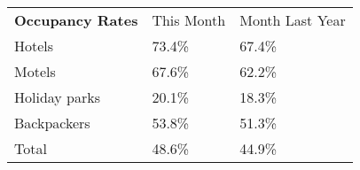 \begin{tabular}[t]{p{4.5cm}>{\hfill}p{1.3cm}>{\hfill}p{1.7cm}}
 \textbf{Occupancy Rates} & This Month & Month Last Year \\ 
 Hotels & 73.4\% & 67.4\% \\ 
  Motels & 67.6\% & 62.2\% \\ 
  Holiday parks & 20.1\% & 18.3\% \\ 
  Backpackers & 53.8\% & 51.3\% \\ 
  Total & 48.6\% & 44.9\% \\ 
  \end{tabular}
